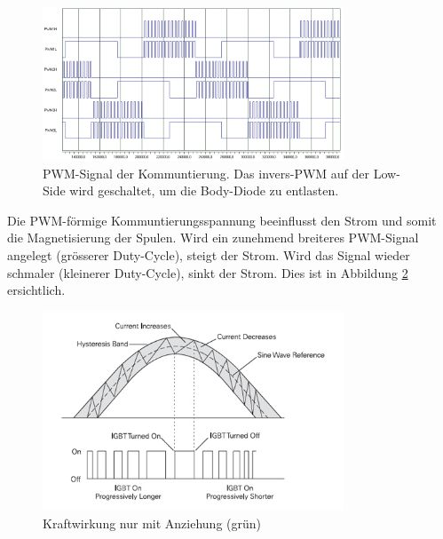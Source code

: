 \begin{figure}[h!]
	\centering
	\includegraphics[width=0.8\textwidth]{graphics/Kommuntierung_BLDC_Blockkommuntierung.png}
	\caption{PWM-Signal der Kommuntierung. Das invers-PWM auf der Low-Side  wird geschaltet, um die Body-Diode zu entlasten.
	\cite{marc_bldc_2015}
	}
	\label{fig:Motor_Kommuntierung_1}
\end{figure}
\newpage
Die PWM-förmige Kommuntierungsspannung beeinflusst den Strom und somit die Magnetisierung der Spulen. Wird ein zunehmend breiteres PWM-Signal angelegt (grösserer Duty-Cycle), steigt der Strom. Wird das Signal wieder schmaler (kleinerer Duty-Cycle), sinkt der Strom. Dies ist in Abbildung \ref{fig:Motor_Kommuntierung_2} ersichtlich.

\begin{figure}[h!]
	\centering
	\includegraphics[width=0.8\textwidth]{graphics/Kommuntierung_BLDC_Sinus_Strom.png}
	\caption{Kraftwirkung nur mit Anziehung (grün) 
	\cite{lehane_wie_2012}
	}
	\label{fig:Motor_Kommuntierung_2}
\end{figure}

